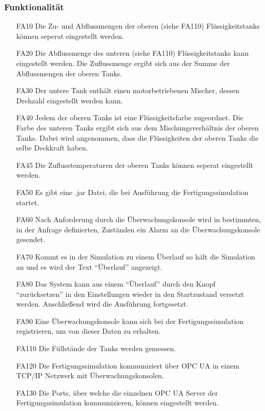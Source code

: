 \documentclass[parskip=full]{scrartcl}
\begin{document}
\subsubsection{Funktionalität}
\begin{enumerate}
\item[FA10] Die Zu- und Abflussmengen der oberen (siehe FA110) Flüssigkeitstanks können seperat eingestellt werden.
\item[FA20] Die Abflussmenge des unteren (siehe FA110) Flüssigkeitstanks kann eingestellt werden. Die Zuflussmenge ergibt sich aus der Summe der Abflussmengen der oberen Tanks.
\item[FA30] Der untere Tank enthält einen motorbetriebenen Mischer, dessen Drehzahl eingestellt werden kann.
\item[FA40] Jedem der oberen Tanks ist eine Flüssigkeitsfarbe zugeordnet. Die Farbe des unteren Tanks ergibt sich aus dem Mischungsverhältnis der oberen Tanks. Dabei wird
  angenommen, dass die Flüssigkeiten der oberen Tanks die selbe Deckkraft haben.
\item[FA45] Die Zuflusstemperaturen der oberen Tanks können seperat eingestellt werden.
\item[FA50] Es gibt eine .jar Datei, die bei Ausführung die Fertigungssimulation startet.
\item[FA60] Nach Anforderung durch die \"Uberwachungskonsole wird in bestimmten, in der Anfrage definierten, Zust\"anden ein Alarm an die \"Uberwachungskonsole gesendet.
\item[FA70] Kommt es in der Simulation zu einem \"Uberlauf so h\"alt die Simulation an und es wird der Text ``\"Uberlauf'' angezeigt.
\item[FA80] Das System kann aus einem ``\"Uberlauf'' durch den Knopf ``zur\"ucksetzen'' in den Einstellungen wieder in den Startzustand versetzt werden. Anschlie{\ss}end wird die Ausführung fortgesetzt.
\item[FA90] Eine \"Uberwachungskonsole kann sich bei der Fertigungssimulation registrieren, um von dieser Daten zu erhalten.
\item[FA110] Die Füllstände der Tanks werden gemessen.
\item[FA120] Die Fertigungssimulation kommuniziert über OPC UA in einem TCP/IP Netzwerk mit Überwachungskonsolen.
\item[FA130] Die Ports, über welche die einzelnen OPC UA Server der Fertigungssimulation kommunizieren, können eingestellt werden.
\end{enumerate}
\end{document}
